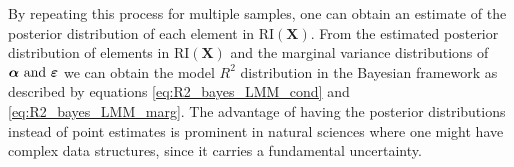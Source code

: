 By repeating this process for multiple samples, one can obtain an estimate of the posterior distribution of each element in $\text{RI}(\mathbf{X})$.
From the estimated posterior distribution of elements in $\text{RI}(\mathbf{X})$ and the marginal variance distributions of $\boldsymbol{\alpha$ and $\boldsymbol{\varepsilon}}$ we can obtain the model $R^2$ distribution in the Bayesian framework as described by equations \eqref{eq:R2_bayes_LMM_cond} and \eqref{eq:R2_bayes_LMM_marg}.
The advantage of having the posterior distributions instead of point estimates is prominent in natural sciences where one might have complex data structures, since it carries a fundamental uncertainty.





